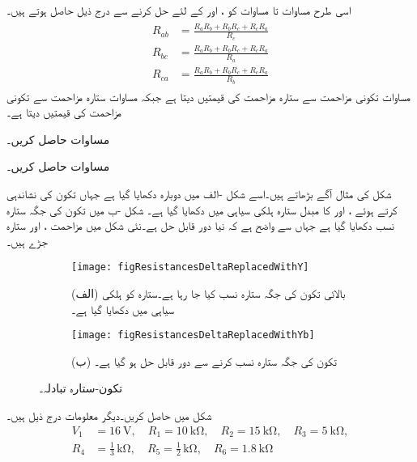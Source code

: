 اسی طرح مساوات  تا مساوات  کو ،  اور  کے لئے حل کرنے سے درج ذیل حاصل ہوتے ہیں۔
\begin{gather}
\begin{aligned}\label{مساوات_مزاحمتی_ستارہ_سے_تکون}
R_{ab}&=\frac{R_a R_b + R_b R_c +R_c R_a}{R_c}\\
R_{bc}&=\frac{R_a R_b + R_b R_c +R_c R_a}{R_a}\\
R_{ca}&=\frac{R_a R_b + R_b R_c +R_c R_a}{R_b}
\end{aligned}
\end{gather}
مساوات   تکونی مزاحمت سے ستارہ مزاحمت کی قیمتیں  دیتا ہے جبکہ مساوات  ستارہ مزاحمت سے تکونی مزاحمت کی قیمتیں دیتا ہے۔

مساوات   حاصل کریں۔


مساوات   حاصل کریں۔

شکل  کی مثال آگے بڑھاتے ہیں۔اسے شکل -الف میں دوبارہ دکھایا گیا ہے جہاں تکون  کی نشاندہی کرتے ہوئے ،  اور  کا مبدل ستارہ ہلکی سیاہی میں دکھایا گیا ہے۔ شکل -ب میں تکون کی جگہ ستارہ نسب دکھایا گیا ہے جہاں سے واضح ہے کہ نیا دور قابل حل ہے۔نئی شکل میں مزاحمت ،  اور  ستارہ جڑے ہیں۔ 
\begin{figure}
\centering
\begin{subfigure}{0.5\textwidth}
\centering
\texttt{[image: figResistancesDeltaReplacedWithY]}
\caption*{(الف) بالائی تکون  کی جگہ ستارہ نسب کیا جا رہا ہے۔ستارہ کو ہلکی سیاہی میں دکھایا گیا ہے۔}
\end{subfigure}%
\begin{subfigure}{0.5\textwidth}
\centering
\texttt{[image: figResistancesDeltaReplacedWithYb]}
\caption*{(ب) تکون کی جگہ ستارہ نسب کرنے سے دور قابل حل ہو گیا ہے۔}
\end{subfigure}%
\caption{تکون-ستارہ تبادلہ۔}
\label{شکل_مزاحمتی_تکون_کا_مبدل}
\end{figure}

شکل  میں  حاصل کریں۔دیگر معلومات درج ذیل ہیں۔
\begin{align*}
V_1&=\SI{16}{\volt}, \quad R_1=\SI{10}{\kilo\ohm}, \quad  R_2=\SI{15}{\kilo\ohm}, \quad R_3=\SI{5}{\kilo\ohm}, \\
R_4&=\frac{1}{3}\,\si{\kilo\ohm}, \quad R_5=\frac{1}{2}\, \si{\kilo\ohm}, \quad R_6=\SI{1.8}{\kilo\ohm}
\end{align*}

